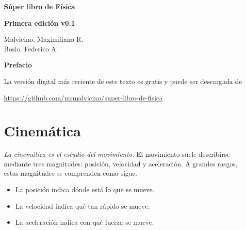 \documentclass[a5paper,12pt,twoside]{book}
\begin{document}
\pagestyle{fancy}
\fancyhf{}
\chead{\scriptsize \nouppercase\rightmark}
\cfoot{\scriptsize \thepage}
\renewcommand{\headrulewidth}{0pt}

\frontmatter


\begin{center}

    \begin{Huge}
    \textbf{Súper libro de Física}
    \end{Huge}

    \vspace{1cm}
    \textbf{Primera edición v0.1}
    \vspace{2cm}

    \begin{Large}
        Malvicino, Maximiliano R. \\
        Bosio, Federico A.
    \end{Large}

\end{center}

\clearpage
\noindent
\textbf{Prefacio}

La versión digital más reciente de este texto es gratis y puede ser descargada de
\begin{center}
    \small
    \url{https://github.com/mrmalvicino/super-libro-de-fisica}
\end{center}

\renewcommand{\spanishappendixname}{Anexo}
\tableofcontents

\mainmatter
{}


\chapter{Cinemática}

\emph{La cinemática es el estudio del movimiento.}
El movimiento suele describirse mediante tres magnitudes: posición, velocidad y aceleración.
A grandes rasgos, estas magnitudes se comprenden como sigue.
\begin{itemize}
    \item La posición indica dónde está lo que se mueve.
    \item La velocidad indica qué tan rápido se mueve.
    \item La aceleración indica con qué fuerza se mueve.
\end{itemize}
\end{document}

